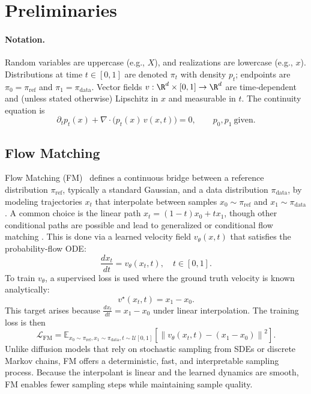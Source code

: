 \documentclass{article}
\begin{document}
\section{Preliminaries}
\label{sec:preliminaries}

\paragraph{Notation.} Random variables are uppercase (e.g., $X$), and realizations are lowercase (e.g., $x$). Distributions at time $t\in[0,1]$ are denoted $\pi_t$ with density $p_t$; endpoints are $\pi_0=\pi_{\mathrm{ref}}$ and $\pi_1=\pi_{\mathrm{data}}$. Vector fields $v:\R^d\times[0,1]\to\R^d$ are time‑dependent and (unless stated otherwise) Lipschitz in $x$ and measurable in $t$. The continuity equation is
\begin{equation}
\label{eq:continuity}
\partial_t p_t(x) + \nabla\!\cdot\!\big(p_t(x)\,v(x,t)\big)=0,\qquad p_0,p_1\ \text{given}.
\end{equation}

\subsection{Flow Matching}

Flow Matching (FM)~\cite{lipman2023fm} defines a continuous bridge between a reference distribution \(\pi_{\mathrm{ref}}\), typically a standard Gaussian, and a data distribution \(\pi_{\mathrm{data}}\), by modeling trajectories \(x_t\) that interpolate between samples \(x_0 \sim \pi_{\mathrm{ref}}\) and \(x_1 \sim \pi_{\mathrm{data}}\). A common choice is the linear path $x_t = (1-t)x_0 + tx_1$, though other conditional paths are possible and lead to generalized or conditional flow matching \cite{tong2024otfm, song2021score, ma2024sit}. This is done via a learned velocity field \(v_\theta(x, t)\) that satisfies the probability-flow ODE:
\[
\frac{dx_t}{dt} = v_\theta(x_t, t), \quad t \in [0,1].
\]
To train \(v_\theta\), a supervised loss is used where the ground truth velocity is known analytically:
\[
v^\star(x_t, t) = x_1 - x_0.
\]
This target arises because \(\frac{dx_t}{dt} = x_1 - x_0\) under linear interpolation. The training loss is then
\[
\mathcal{L}_{\mathrm{FM}} = \mathbb{E}_{x_0 \sim \pi_{\mathrm{ref}}, x_1 \sim \pi_{\mathrm{data}}, t \sim \mathcal{U}[0,1]} \left[ \left\| v_\theta(x_t, t) - (x_1 - x_0) \right\|^2 \right].
\]
Unlike diffusion models that rely on stochastic sampling from SDEs or discrete Markov chains, FM offers a deterministic, fast, and interpretable sampling process. Because the interpolant is linear and the learned dynamics are smooth, FM enables fewer sampling steps while maintaining sample quality.
\end{document}
